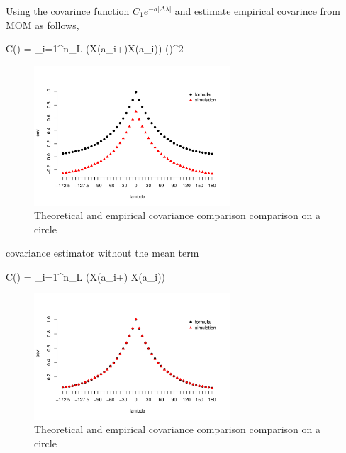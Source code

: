 Using the covarince function $C_1e^{-a|\Delta\lambda|}$ and estimate empirical covarince from MOM as follows,

\beq\label{cov:circle1}
C(\theta) =  \sum_{i=1}^{n_L} (X(a_i+\theta)\cdot X(a_i))-()^2
\eeq

\begin{figure}
\centering
\includegraphics[width=0.65\textwidth]{graphs/Summary-covarince_circle_1}
\caption {Theoretical and empirical covariance comparison comparison on a circle}
\end{figure}

covariance estimator without the mean term

\beq \label{cov:circle1}  
C(\theta) =  \sum_{i=1}^{n_L} (X(a_i+\theta) \cdot X(a_i)) 
\eeq

\begin{figure}
\centering
\includegraphics[width=0.65\textwidth]{graphs/Summary-covarince_circle_2}
\caption {Theoretical and empirical covariance comparison comparison on a circle}
\end{figure}